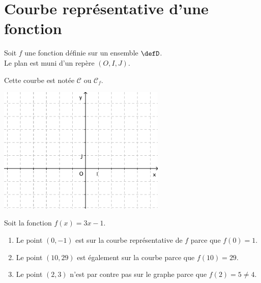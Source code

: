 \section{Courbe représentative d'une fonction}

Soit $f$ une fonction définie sur un ensemble $\defD$. \\ Le plan est muni d'un repère $(O,I,J)$.

\begin{definition}
\end{definition}

Cette courbe est notée $\mathscr{C}$ ou $\mathscr{C}_f$.\\

{\centering 
  \includegraphics[width=8cm]{F_Axes.pdf}    
\par}

\begin{definition}
\end{definition}

\begin{example}
    Soit la fonction \( f(x)=3x-1\).
    \begin{enumerate}
        \item
            Le point \( (0,-1)\) est sur la courbe représentative de \( f\) parce que \( f(0)=1\).
        \item
            Le point \( (10,29)\) est également sur la courbe parce que \( f(10)=29\).
        \item
            Le point \( (2,3)\) n'est par contre pas sur le graphe parce que \( f(2)=5\neq 4\).
    \end{enumerate}
\end{example}

